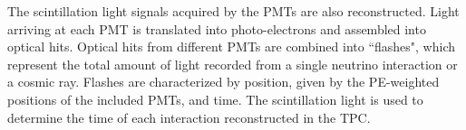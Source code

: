 \documentclass[%
 reprint,
 twocolumn,
superscriptaddress,
showpacs,preprintnumbers,
 amsmath,amssymb,
 aps,
prd,
longbibliography
]{revtex4-1}
\begin{document}
The scintillation light signals acquired by the PMTs are also reconstructed. Light arriving at each PMT is translated into photo-electrons and assembled into optical hits. Optical hits from different PMTs are combined into ``flashes", which represent the total amount of light recorded from a single neutrino interaction or a cosmic ray.
Flashes are characterized by position, given by the PE-weighted positions of the included PMTs, and time.
The scintillation light is %
used to determine the time of each interaction reconstructed in the TPC.



\end{document}
